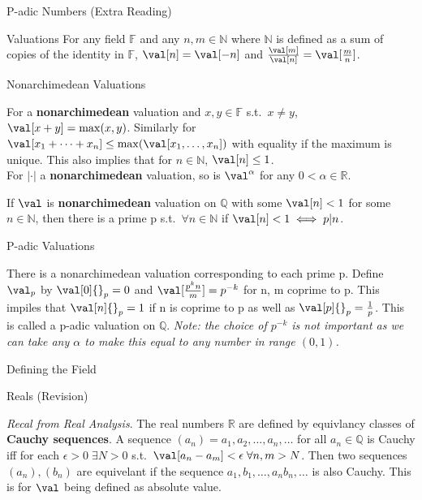 \documentclass[12pt, letterpaper]{article}
\newcommand{\R}{\mathbb{R}}
\newcommand{\Q}{\mathbb{Q}}
\newcommand{\F}{\mathbb{F}}
\newcommand{\N}{\mathbb{N}}
\begin{document}
\begin{section}{P-adic Numbers (Extra Reading)}
\begin{subsection}{Valuations}
    For any field \(\F\) and any \(n, m \in \N\) where \(\N\) is defined as a
    sum of copies of the identity in \(\F\), \(\val[n] = \val[-n]\) and
    \(\frac{\val[m]}{\val[n]} = \val[\frac{m}{n}]\).

    \begin{subsubsection}{Nonarchimedean Valuations}

      For a \textbf{nonarchimedean} valuation and \(x, y \in \F\) s.t.\ \(x
      \neq y\), \(\val[ x + y] = \max(x, y)\). Similarly for \(\val[ x_{1} +
      \cdots + x_{n}] \leq \max(\val[x_{1} , \dots , x_{n}])\) with equality if the
      maximum is unique. This also implies that for \(n \in \N\), \(\val[n] \leq
      1\). \\
      For \(| \cdot |\) a \textbf{nonarchimedean} valuation, so is \(\val
      ^{\alpha}\) for any \(0 < \alpha \in \R\).

      If \(\val\) is \textbf{nonarchimedean} valuation on \(\Q\) with some
      \(\val[n] < 1\) for some \(n \in \N\), then there is a prime p s.t.\
      \(\forall n \in \N\) if \(\val[n] < 1 \iff p | n\).

    \end{subsubsection}

    \begin{subsubsection}{P-adic Valuations}

      There is a nonarchimedean valuation corresponding to each prime p. Define
      \(\val_{p}\) by \(\val[0]{}_{p} = 0\) and \(\val[\frac{p^{k}n}{m}] =
      p^{-k}\) for n, m coprime to p. This impiles that \(\val[n]{}_{p} = 1\)
      if n is coprime to p as well as \(\val[p]{}_{p} = \frac{1}{p}\). This is
      called a p-adic valuation on \(\Q\). \textit{Note: the choice of
        \(p^{-k}\) is not important as we can take any \(\alpha\) to make this
        equal to any number in range \((0, 1)\).}

    \end{subsubsection}

  \end{subsection}

  \begin{subsection}{Defining the Field}

    \begin{subsubsection}{Reals (Revision)}

      \textit{Recal from Real Analysis}. The real numbers \(\R\) are defined by
      equivlancy classes of \textbf{Cauchy sequences}. A sequence \((a_{n}) =
      a_{1}, a_{2}, \dots , a_{n} , \dots\) for all \(a_{n} \in \Q\) is Cauchy
      iff for each \(\epsilon > 0 \; \exists N > 0\) s.t.\ \(\val[a_{n} -
      a_{m}] < \epsilon \; \forall n, m > N\). Then two sequences \((a_{n}),
      (b_{n})\) are equivelant if the sequence \(a_{1}, b_{1}, \dots , a_{n}
      b_{n}, \dots\) is also Cauchy. This is for \(\val\) being defined as
      absolute value.


\end{subsubsection}
\end{subsection}
\end{section}
\end{document}
